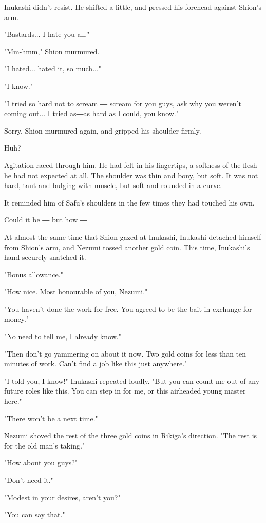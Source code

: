 Inukashi didn't resist. He shifted a little, and pressed his forehead
against Shion's arm.

"Bastards... I hate you all."

"Mm-hmm," Shion murmured.

"I hated... hated it, so much..."

"I know."

"I tried so hard not to scream ― scream for you guys, ask why you
weren't coming out... I tried as―as hard as I could, you know."

Sorry, Shion murmured again, and gripped his shoulder firmly.

Huh?

Agitation raced through him. He had felt in his fingertips, a softness
of the flesh he had not expected at all. The shoulder was thin and bony,
but soft. It was not hard, taut and bulging with muscle, but soft and
rounded in a curve.

It reminded him of Safu's shoulders in the few times they had touched
his own.

Could it be ― but how ―

At almost the same time that Shion gazed at Inukashi, Inukashi detached
himself from Shion's arm, and Nezumi tossed another gold coin. This
time, Inukashi's hand securely snatched it.

"Bonus allowance."

"How nice. Most honourable of you, Nezumi."

"You haven't done the work for free. You agreed to be the bait in
exchange for money."

"No need to tell me, I already know."

"Then don't go yammering on about it now. Two gold coins for less than
ten minutes of work. Can't find a job like this just anywhere."

"I told you, I know!" Inukashi repeated loudly. "But you can count me
out of any future roles like this. You can step in for me, or this
airheaded young master here."

"There won't be a next time."

Nezumi shoved the rest of the three gold coins in Rikiga's direction.
"The rest is for the old man's taking."

"How about you guys?"

"Don't need it."

"Modest in your desires, aren't you?"

"You can say that."

